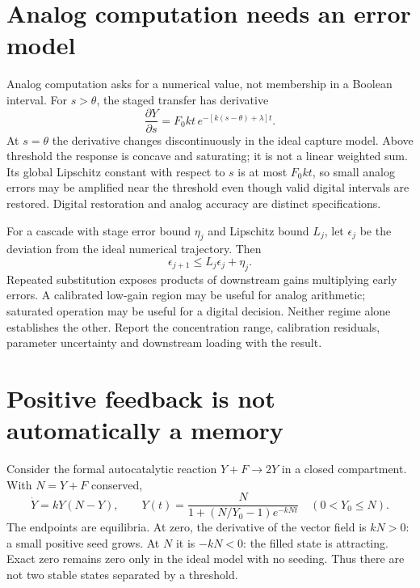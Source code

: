 \section{Analog computation needs an error model}

Analog computation asks for a numerical value, not membership in a Boolean
interval. For $s>\theta$, the staged transfer has derivative
\begin{equation}
 \frac{\partial Y}{\partial s}
 =F_0kt\,e^{-[k(s-\theta)+\lambda]t}.
 \label{eq:sensitivity}
\end{equation}
At $s=\theta$ the derivative changes discontinuously in the ideal capture
model. Above threshold the response is concave and saturating; it is not a
linear weighted sum. Its global Lipschitz constant with respect to $s$ is at
most $F_0kt$, so small analog errors may be amplified near the threshold even
though valid digital intervals are restored. Digital restoration and analog
accuracy are distinct specifications.

For a cascade with stage error bound $\eta_j$ and Lipschitz bound $L_j$,
let $\epsilon_j$ be the deviation from the ideal numerical trajectory. Then
\begin{equation}
 \epsilon_{j+1}\leq L_j\epsilon_j+\eta_j .
\end{equation}
Repeated substitution exposes products of downstream gains multiplying early
errors. A calibrated low-gain region may be useful for analog arithmetic;
saturated operation may be useful for a digital decision. Neither regime
alone establishes the other. Report the concentration range, calibration
residuals, parameter uncertainty and downstream loading with the result.

\section{Positive feedback is not automatically a memory}

Consider the formal autocatalytic reaction $Y+F\to2Y$ in a closed compartment.
With $N=Y+F$ conserved,
\begin{equation}
 \dot Y=kY(N-Y),\qquad
 Y(t)=\frac{N}{1+(N/Y_0-1)e^{-kNt}}\quad(0<Y_0\leq N).
\end{equation}
The endpoints are equilibria. At zero, the derivative of the vector field is
$kN>0$: a small positive seed grows. At $N$ it is $-kN<0$: the filled state is
attracting. Exact zero remains zero only in the ideal model with no seeding.
Thus there are not two stable states separated by a threshold.

